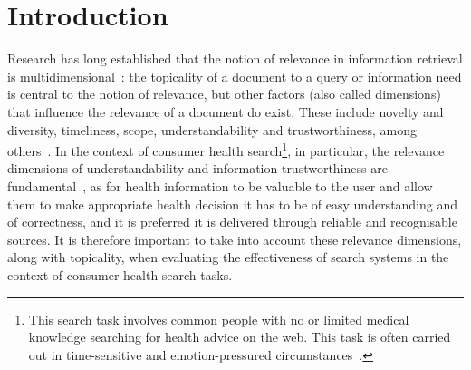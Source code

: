\section{Introduction}
\label{chp:evaluation_metrics}


Research has long established that the notion of relevance in information retrieval is multidimensional~\cite{schamber94,borlund03}: the topicality of a document to a query or information need is central to the notion of relevance, but other factors (also called dimensions) that influence the relevance of a document do exist. These include novelty and diversity, timeliness, scope, understandability and trustworthiness, among others~\cite{park93,schamber94}. In the context of consumer health search\footnote{This search task involves common people with no or limited medical knowledge searching for health advice on the web. This task is often carried out in time-sensitive and emotion-pressured circumstances~\cite{}.}, in particular, the relevance dimensions of understandability and information trustworthiness are fundamental~\cite{hersh08}, as for health information to be valuable to the user and allow them to make appropriate health decision it has to be of easy understanding and of correctness, and it is preferred it is delivered through reliable and recognisable sources. It is therefore important to take into account these relevance dimensions, along with topicality, when evaluating the effectiveness of search systems in the context of consumer health search tasks.

